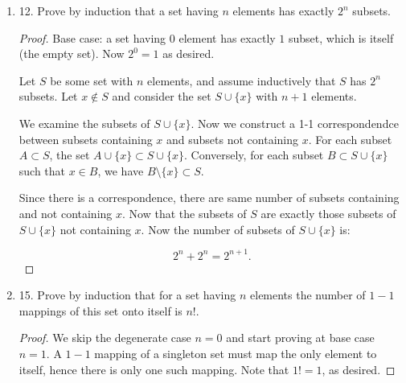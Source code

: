 \begin{enumerate}[resume]
	\item 12. Prove by induction that a set having $n$ elements has exactly $2^n$ subsets.
\begin{proof}
	Base case: a set having $0$ element has exactly $1$ subset, which is itself (the empty set). Now $2^0 = 1$ as desired.

	Let $S$ be some set with $n$ elements, and assume inductively that  $S$ has $2^n$ subsets. Let $x \not\in S$ and consider the set $S \cup \{x\} $ with $n+1$ elements.

	We examine the subsets of $S \cup \{x\} $. Now we construct a 1-1 correspondendce between subsets containing $x$ and subsets not containing $x$. For each subset $A \subset S$, the set $A \cup \{x\} \subset S \cup \{x\} $. Conversely, for each subset $B \subset S \cup \{x\} $ such that $x \in B$, we have $B\setminus \{x\} \subset S$.

	Since there is a correspondence, there are same number of subsets containing and not containing $x$. Now that the subsets of $S$ are exactly those subsets of $S \cup \{x\} $ not containing $x$. Now the number of subsets of $S \cup \{x\} $ is:

	\[
		2^n + 2^n = 2^{n+1}
	.\] 
\end{proof}

	\item 15. Prove by induction that for a set having $n$ elements the number of $1-1$ mappings of this set onto itself is $n !$.
\begin{proof}
	We skip the degenerate case $n = 0$ and start proving at base case $n = 1$. A  $1-1$ mapping of a singleton set must map the only element to itself, hence there is only one such mapping. Note that $1! = 1$, as desired.


\end{proof}
\end{enumerate}
